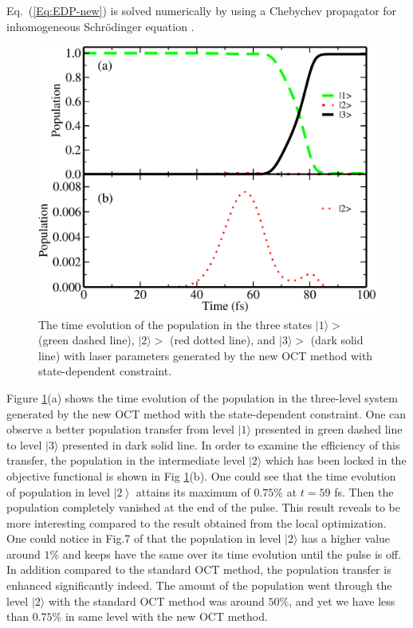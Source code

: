 \documentclass[]{interact}
\theoremstyle{plain}%
\theoremstyle{definition}
\theoremstyle{remark}
\begin{document}
Eq.~(\ref{Eq:EDP-new}) is solved numerically by using a Chebychev propagator 
for inhomogeneous Schr\"odinger equation \cite{Ndong}.
\begin{figure}[h!]
\centering
\includegraphics[width=0.7\linewidth]{Figure6}
\caption{The time evolution of the population in the three states 
$|1\rangle>$ (green dashed line), $|2\rangle>$ (red dotted line), and 
$|3\rangle>$ (dark solid line) with laser parameters generated by the new 
OCT method with state-dependent constraint. 
\label{Fig:Populations-OCT-New}}
\end{figure}
Figure \ref{Fig:Populations-OCT-New}(a) shows the time evolution of the 
population in the three-level system generated by the new OCT method with the 
state-dependent constraint. One can observe a better population transfer from 
level $|1\rangle$ presented in green dashed line to level $|3\rangle$ presented 
in dark solid line. 
In order to examine the efficiency of this transfer, the 
population in the intermediate level $|2\rangle$ which has been locked in 
the objective functional is shown in Fig \ref{Fig:Populations-OCT-New}(b). One 
could see that the time evolution of population in level $\left|2\right>$ 
attains its maximum of $0.75\%$ at $t=59$ fs. Then the population 
completely vanished at the end of the pulse. This result reveals to be more 
interesting compared to the result obtained from the local 
optimization. One could notice in Fig.7 of \cite{Bartana} that the population 
in level $|2\rangle$ has a higher value around $1\%$ and keeps 
have the same over its time evolution until the pulse is off. 
In addition compared to the standard OCT method, the population transfer is 
enhanced significantly indeed. The amount of the population went through the 
level $|2\rangle$ with the standard OCT method was around $50\%$, and yet we 
have less than $0.75\%$ in same level with the new OCT method.
\end{document}
